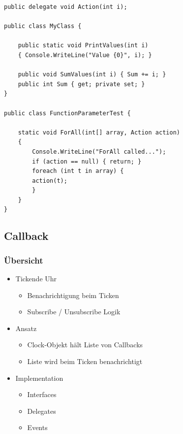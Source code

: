\begin{lstlisting}
public delegate void Action(int i);

public class MyClass {

    public static void PrintValues(int i)
    { Console.WriteLine("Value {0}", i); }

    public void SumValues(int i) { Sum += i; }
    public int Sum { get; private set; }
}

public class FunctionParameterTest {

    static void ForAll(int[] array, Action action)
    {
        Console.WriteLine("ForAll called...");
        if (action == null) { return; }
        foreach (int t in array) {
        action(t);
        }
    }
}
\end{lstlisting}

\subsection{Callback}

\subsubsection{Übersicht}

\begin{itemize}
    \item Tickende Uhr
    \begin{itemize}
        \item Benachrichtigung beim Ticken
        \item Subscribe / Unsubscribe Logik
    \end{itemize}
    \item Ansatz
    \begin{itemize}
        \item Clock-Objekt hält Liste von Callbacks
        \item Liste wird beim Ticken benachrichtigt
    \end{itemize}
    \item Implementation
    \begin{itemize}
        \item Interfaces
        \item Delegates
        \item Events
    \end{itemize}
\end{itemize}

